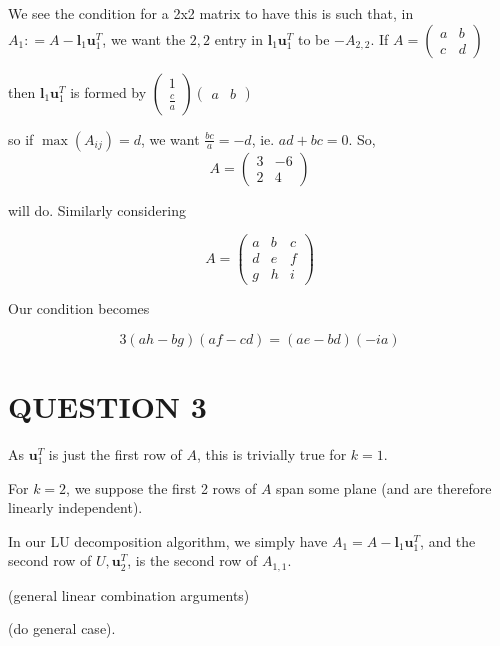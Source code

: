 \documentclass[a4paper]{article}
\begin{document}
We see the condition for a 2x2 matrix to have this is such that, in $ A_{1} : = A - \mathbf{l}_{1} \mathbf{u}_{1}^{T} $, we want the $ 2,2 $ entry in $ \mathbf{l}_{1} \mathbf{u}_{1}^{T} $ to be $ - A_{2,2} $. If $ A = \begin{pmatrix}
a & b \\
c & d
\end{pmatrix} $

then $ \mathbf{l}_{1} \mathbf{u}_{1}^{T} $ is formed by $ \begin{pmatrix}
1 \\
\frac{c}{a}
\end{pmatrix} \begin{pmatrix}
a & b
\end{pmatrix}  $

so if $ \max(A_{ij})  = d $, we want $ \frac{bc}{a} = -d $, ie. $ ad + bc = 0 $. So, \[ A = \begin{pmatrix}
3 & -6\\
2 & 4
\end{pmatrix} \]

will do. Similarly considering 

\[ A = \begin{pmatrix}
a & b & c \\
d & e & f \\
g & h & i
\end{pmatrix} \]

Our condition becomes 

\[ 3(ah - bg)(af - cd) = (ae - bd)(-ia) \]



\section{QUESTION 3}

As $ \mathbf{u}_{1}^{T} $ is just the first row of $ A $, this is trivially true for $ k = 1 $. 

For $ k = 2 $, we suppose the first 2 rows of $ A $ span some plane (and are therefore linearly independent). 

In our LU decomposition algorithm, we simply have $ A_{1} = A - \mathbf{l}_{1} \mathbf{u}_{1}^{T}  $, and the second row of $ U, \mathbf{u}_{2}^{T} $, is the second row of $ A_{1,1} $. 

(general linear  combination arguments)

(do general case). 
\end{document}
